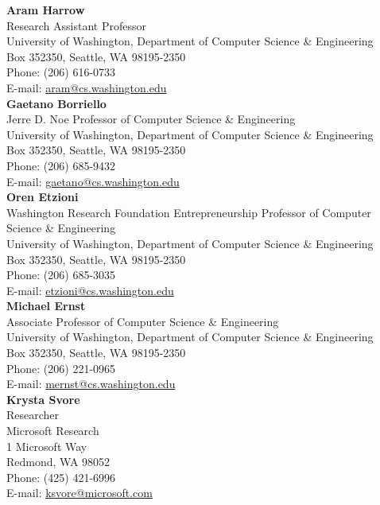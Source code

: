 \documentclass[letter]{article}
\begin{document}
{\bf Aram Harrow}
\\
Research Assistant Professor\\
University of Washington, Department of Computer Science \& Engineering\\
Box 352350, Seattle, WA 98195-2350\\
Phone: (206) 616-0733\\
E-mail: \url{aram@cs.washington.edu}\\

{\bf Gaetano Borriello}\\
Jerre D. Noe Professor of Computer Science \& Engineering\\
University of Washington, Department of Computer Science \& Engineering\\
Box 352350, Seattle, WA 98195-2350\\
Phone: (206) 685-9432\\
E-mail: \url{gaetano@cs.washington.edu}\\

{\bf Oren Etzioni}\\
Washington Research Foundation Entrepreneurship Professor of Computer Science \& Engineering\\
University of Washington, Department of Computer Science \& Engineering\\
Box 352350, Seattle, WA 98195-2350\\
Phone: (206) 685-3035\\
E-mail: \url{etzioni@cs.washington.edu}\\

{\bf Michael Ernst}\\
Associate Professor of Computer Science \& Engineering\\
University of Washington, Department of Computer Science \& Engineering\\
Box 352350, Seattle, WA 98195-2350\\
Phone: (206) 221-0965\\
E-mail: \url{mernst@cs.washington.edu}\\

{\bf Krysta Svore}\\
Researcher\\
Microsoft Research\\
1 Microsoft Way\\
Redmond, WA 98052\\
Phone: (425) 421-6996\\
E-mail: \url{ksvore@microsoft.com}\\
\end{document}
